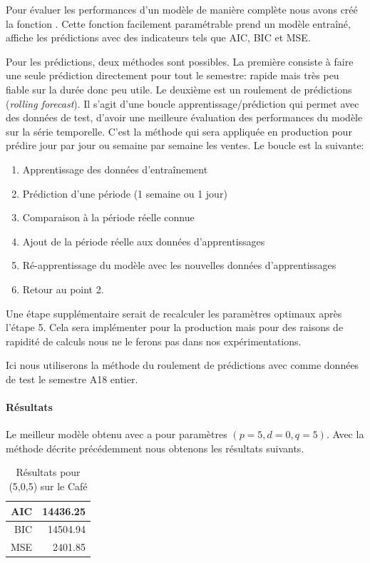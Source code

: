 Pour évaluer les performances d'un modèle de manière complète nous avons créé la fonction . Cette fonction facilement paramétrable prend un modèle entraîné, affiche les prédictions avec des indicateurs tels que AIC, BIC et MSE.

Pour les prédictions, deux méthodes sont possibles.
La première consiste à faire une seule prédiction directement pour tout le semestre: rapide mais très peu fiable sur la durée donc peu utile.
Le deuxième est un roulement de prédictions (\emph{rolling forecast}). Il s'agit d'une boucle apprentissage/prédiction qui permet avec des données de test, d'avoir une meilleure évaluation des performances du modèle sur la série temporelle. C'est la méthode qui sera appliquée en production pour prédire jour par jour ou semaine par semaine les ventes.
Le boucle est la suivante:
\begin{enumerate}[nolistsep]
    \item Apprentissage des données d'entraînement
    \item Prédiction d'une période (1 semaine ou 1 jour)
    \item Comparaison à la période réelle connue
    \item Ajout de la période réelle aux données d'apprentissages
    \item Ré-apprentissage du modèle avec les nouvelles données d'apprentissages
    \item Retour au point 2.
\end{enumerate}

Une étape supplémentaire serait de recalculer les paramètres optimaux après l'étape 5. Cela sera implémenter pour la production mais pour des raisons de rapidité de calculs nous ne le ferons pas dans nos expérimentations.

Ici nous utiliserons la méthode du roulement de prédictions avec comme données de test le semestre A18 entier.


\paragraph{Résultats}
\label{par:arima_results}

Le meilleur modèle \ARIMA obtenu avec  a pour paramètres $(p=5, d=0, q=5)$. Avec la méthode décrite précédemment nous obtenons les résultats suivants.

\begin{table}[ht]
    \centering
    \begin{tabular}{r|r}
        AIC & 14436.25 \\
        \hline
        BIC & 14504.94 \\
        \hline
        MSE &  2401.85 \\
    \end{tabular}
    \caption{Résultats pour \ARIMA(5,0,5) sur le Café}
    \label{tab:pred_arima_cafe}
\end{table}

